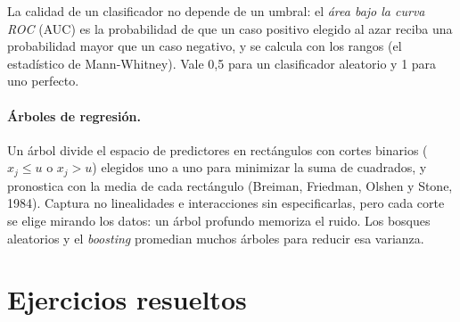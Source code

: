 La calidad de un clasificador no depende de un umbral: el \emph{área bajo la curva ROC} (AUC) es la probabilidad de que un caso positivo
elegido al azar reciba una probabilidad mayor que un caso negativo, y se calcula con los rangos (el estadístico de Mann-Whitney). Vale
0,5 para un clasificador aleatorio y 1 para uno perfecto.

\paragraph{Árboles de regresión.} Un árbol divide el espacio de predictores en rectángulos con cortes binarios
($x_j\le u$ o $x_j>u$) elegidos uno a uno para minimizar la suma de cuadrados, y pronostica con la media de cada rectángulo
(Breiman, Friedman, Olshen y Stone, 1984). Captura no linealidades e interacciones sin especificarlas, pero cada corte se elige
mirando los datos: un árbol profundo memoriza el ruido. Los bosques aleatorios y el \emph{boosting} promedian muchos árboles para
reducir esa varianza.

\section{Ejercicios resueltos}

